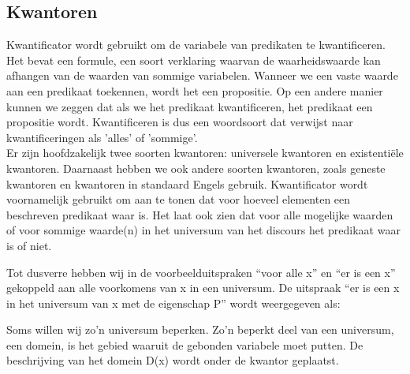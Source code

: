 \documentclass{article}
\begin{document}
	\subsection{Kwantoren}
	Kwantificator wordt gebruikt om de variabele van predikaten te kwantificeren. Het bevat een formule, een soort verklaring waarvan de waarheidswaarde kan afhangen van de waarden van sommige variabelen. Wanneer we een vaste waarde aan een predikaat toekennen, wordt het een propositie. Op een andere manier kunnen we zeggen dat als we het predikaat kwantificeren, het predikaat een propositie wordt. Kwantificeren is dus een woordsoort dat verwijst naar kwantificeringen als 'alles' of 'sommige'.\\	Er zijn hoofdzakelijk twee soorten kwantoren: universele kwantoren en existentiële kwantoren. Daarnaast hebben we ook andere soorten kwantoren, zoals geneste kwantoren en kwantoren in standaard Engels gebruik. Kwantificator wordt voornamelijk gebruikt om aan te tonen dat voor hoeveel elementen een beschreven predikaat waar is. Het laat ook zien dat voor alle mogelijke waarden of voor sommige waarde(n) in het universum van het discours het predikaat waar is of niet.
	
	
	Tot dusverre hebben wij in de voorbeelduitspraken “voor alle x” en “er is een x” gekoppeld
	aan alle voorkomens van x in een universum. De uitspraak “er is een x in het
	universum van x met de eigenschap P” wordt weergegeven als:
	
	
	Soms willen wij zo’n universum beperken. Zo’n beperkt deel van een universum, een
	domein, is het gebied waaruit de gebonden variabele moet putten. De beschrijving van
	het domein D(x) wordt onder de kwantor geplaatst.
	
\end{document}
